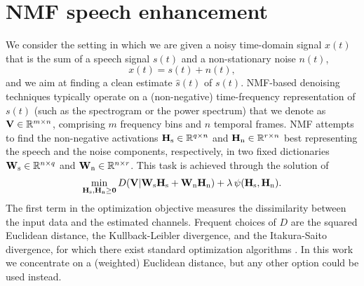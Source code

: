 \section{NMF speech enhancement}
\label{sec:nmf}

%
We consider the setting in which we are given a noisy time-domain signal $x(t)$ that is the sum of a speech signal $s(t)$ and a non-stationary noise $n(t)$,
$$ x(t) = s(t) + n(t),$$
and we aim at finding a clean estimate $\hat{s}(t)$ of $s(t)$.
NMF-based denoising techniques typically operate on a (non-negative) time-frequency representation of $s(t)$ (such as the spectrogram or the power spectrum)
that we denote as $\bm{\mathrm{V}} \in \mathbb{R}^{m \times n}$, comprising $m$ frequency bins and $n$ temporal frames. NMF attempts to find the non-negative activations $\bm{\mathrm{H}}_{\mathrm{s}} \in \mathbb{R}^{q \times n}$ and $\bm{\mathrm{H}}_{\mathrm{n}} \in \mathbb{R}^{r \times n}$ best representing the speech and the noise components, respectively, in two fixed dictionaries $\bm{\mathrm{W}}_{\mathrm{s}} \in \mathbb{R}^{n \times q}$ and $\bm{\mathrm{W}}_{\mathrm{n}} \in \mathbb{R}^{n \times r}$.
%
This task is achieved through the solution of %
\begin{eqnarray}
\label{eq:optim_general}
\min_{ \bm{\mathrm{H}}_{\mathrm{s}}, \bm{\mathrm{H}}_{\mathrm{n}} \ge \bm{\mathrm{0}}  } D( \bm{\mathrm{V}} |  \bm{\mathrm{W}}_{\mathrm{s}} \bm{\mathrm{H}}_{\mathrm{s}} + \bm{\mathrm{W}}_{\mathrm{n}}\bm{\mathrm{H}}_{\mathrm{n}} ) + 
\lambda\, \psi(\bm{\mathrm{H}}_{\mathrm{s}}, \bm{\mathrm{H}}_{\mathrm{n}}).
\end{eqnarray}
The first term in the optimization objective measures the dissimilarity between the input data and the estimated channels. 
Frequent choices of $D$ are the squared Euclidean distance,
the Kullback-Leibler divergence, and the Itakura-Saito divergence, for which there exist standard optimization algorithms \cite{fevotte2011algorithms}.
In this work we concentrate on a (weighted) Euclidean distance, but any other option could be used instead.
%
